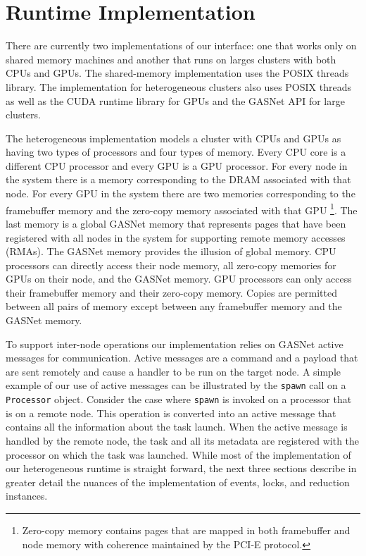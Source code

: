 
\section{Runtime Implementation}
\label{sec:impl}

There are currently two implementations of our interface:
one that works only on shared memory machines and another that
runs on larges clusters with both CPUs and GPUs.  The shared-memory
implementation uses the POSIX threads library.
The implementation for heterogeneous clusters also uses POSIX
threads as well as the CUDA runtime library for GPUs\cite{CUDA} and the GASNet
API for large clusters\cite{GASNET07}.  

The heterogeneous implementation
models a cluster with CPUs and GPUs as having two types of processors 
and four types of memory.  Every CPU core is a different CPU processor
and every GPU is a GPU processor.  For every node in the system
there is a memory corresponding to the DRAM associated with that node.  For
every GPU in the system there are two memories corresponding to the framebuffer
memory and the zero-copy memory associated with that GPU \footnote{Zero-copy 
memory contains pages that are mapped in both framebuffer and node memory with
coherence maintained by the PCI-E protocol.}. The last memory is 
a global GASNet memory that represents pages that have been registered 
with all nodes in the system for supporting remote memory accesses (RMAs).
The GASNet memory provides the illusion of global memory.  CPU processors
can directly access their node memory, all zero-copy memories for GPUs on
their node, and the GASNet memory.  GPU processors can only access their
framebuffer memory and their zero-copy memory.  Copies are permitted
between all pairs of memory except between any framebuffer memory and
the GASNet memory.

To support inter-node operations our implementation relies on GASNet active
messages for communication.  Active messages are a command and a payload
that are sent remotely and cause a handler to be run on the target node.
A simple example of our use of active messages can be illustrated by the 
{\tt spawn} call on a {\tt Processor} object.  Consider the case where {\tt spawn}
is invoked on a processor that is on a remote node.  This operation is converted into
an active message that contains all the information about the task launch.
When the active message is handled by the remote node, the task and all its
metadata are registered with the processor on which the task was launched.
While most of the implementation of our heterogeneous runtime is straight
forward, the next three sections describe in greater detail the nuances
of the implementation of events, locks, and reduction instances.

